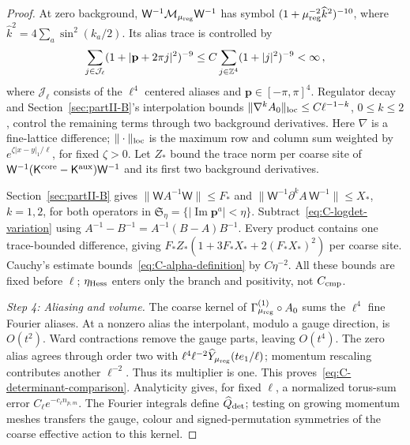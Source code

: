 \begin{proof}
At zero background, $\mathsf W^{-1}\mathcal M_{\mu_{\rm reg}}\mathsf W^{-1}$ has symbol $(1+\mu_{\rm reg}^{-2}\widehat k^2)^{-10}$, where $\widehat k^2=4\sum_a\sin^2(k_a/2)$. Its alias trace is controlled by
\begin{equation*}
 \sum_{j\in\mathcal J_\ell}(1+|\mathbf p+2\pi j|^2)^{-9}
 \le C\sum_{j\in\mathbb{Z}^4}(1+|j|^2)^{-9}<\infty\,,
\end{equation*}
where $\mathcal J_\ell$ consists of the $\ell^4$ centered aliases and $\mathbf p\in[-\pi,\pi]^4$. Regulator decay and Section~\ref{sec:partII-B}'s interpolation bounds $\|\nabla^k A_0\|_{\rm loc}\le C\ell^{-1-k}$, $0\le k\le2$, control the remaining terms through two background derivatives. Here $\nabla$ is a fine-lattice difference; $\|\cdot\|_{\rm loc}$ is the maximum row and column sum weighted by $e^{\zeta|x-y|_1/\ell}$, for fixed $\zeta>0$. Let $Z_*$ bound the trace norm per coarse site of $\mathsf W^{-1}(\mathsf K^{\rm core}-\mathsf K^{\rm aux})\mathsf W^{-1}$ and its first two background derivatives.

Section~\ref{sec:partII-B} gives $\|\mathsf W A^{-1}\mathsf W\|\le F_*$ and $\|\mathsf W^{-1}\partial^k A\,\mathsf W^{-1}\|\le X_*$, $k=1,2$, for both operators in $\mathfrak S_\eta=\{|\operatorname{Im}\mathbf p^a|<\eta\}$. Subtract~\eqref{eq:C-logdet-variation} using $A^{-1}-B^{-1}=A^{-1}(B-A)B^{-1}$. Every product contains one trace-bounded difference, giving
$F_*Z_*(1+3F_*X_*+2(F_*X_*)^2)$ per coarse site. Cauchy's estimate bounds~\eqref{eq:C-alpha-definition} by $C\eta^{-2}$. All these bounds are fixed before $\ell$; $\eta_{\rm Hess}$ enters only the branch and positivity, not $C_{\rm cmp}$.

\emph{Step 4: Aliasing and volume.}
The coarse kernel of $\Gamma^{(1)}_{\mu_{\rm reg}}\circ A_0$ sums the $\ell^4$ fine Fourier aliases. At a nonzero alias the interpolant, modulo a gauge direction, is $O(t^2)$. Ward contractions remove the gauge parts, leaving $O(t^4)$. The zero alias agrees through order two with $\ell^4\ell^{-2}\widehat Y_{\mu_{\rm reg}}(te_1/\ell)$; momentum rescaling contributes another $\ell^{-2}$. Thus its multiplier is one. This proves~\eqref{eq:C-determinant-comparison}. Analyticity gives, for fixed $\ell$, a normalized torus-sum error $C_\ell e^{-c_\ell n_{p,m}}$. The Fourier integrals define $\widehat Q_{\rm det}$; testing on growing momentum meshes transfers the gauge, colour and signed-permutation symmetries of the coarse effective action to this kernel.
\end{proof}

